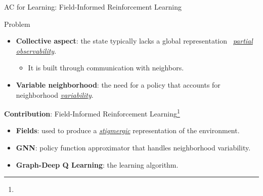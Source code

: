 \documentclass[presentation, 8pt,169]{beamer}\mode<presentation>{\usetheme{AMSBolognaFC}}
\begin{document}
\begin{frame}{AC for Learning: Field-Informed Reinforcement Learning}

  \begin{block}{Problem}
    \begin{itemize}
      \item \textbf{Collective aspect}: the state typically lacks a global representation \faArrowRight \, \emph{\underline{partial observability}}.
        \begin{itemize}
          \item It is built through communication with neighbors.
        \end{itemize}
      \item \textbf{Variable neighborhood}: the need for a policy that accounts for neighborhood \emph{\underline{variability}}.

    \end{itemize}
  \end{block}

  \begin{alertblock}{\textbf{Contribution}: Field-Informed Reinforcement Learning\footnote[frame]{}} 
    \begin{itemize}
      \item \textbf{Fields}: used to produce a \emph{\underline{stigmergic}} representation of the environment.
      \item \textbf{GNN}: policy function approximator that handles neighborhood variability.
      \item \textbf{Graph-Deep Q Learning}: the learning algorithm.
    \end{itemize}
  \end{alertblock}

\end{frame}
\end{document}
